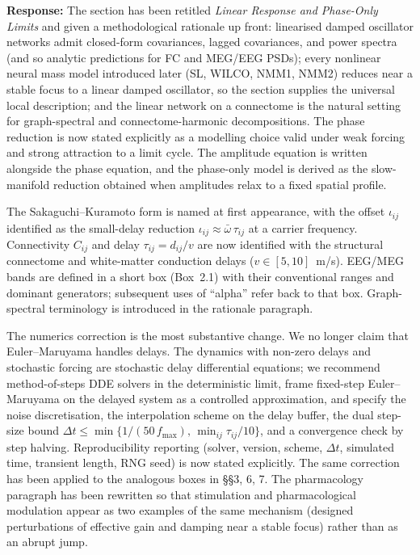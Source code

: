 \documentclass[12pt,a4paper]{article}
\newcommand{\ourresponse}[1]{\par\noindent\textbf{Response:} #1\par\medskip}
\begin{document}
\ourresponse{The section has been retitled \emph{Linear Response and Phase-Only Limits} and given a methodological rationale up front: linearised damped oscillator networks admit closed-form covariances, lagged covariances, and power spectra (and so analytic predictions for FC and MEG/EEG PSDs); every nonlinear neural mass model introduced later (SL, WILCO, NMM1, NMM2) reduces near a stable focus to a linear damped oscillator, so the section supplies the universal local description; and the linear network on a connectome is the natural setting for graph-spectral and connectome-harmonic decompositions. The phase reduction is now stated explicitly as a modelling choice valid under weak forcing and strong attraction to a limit cycle. The amplitude equation is written alongside the phase equation, and the phase-only model is derived as the slow-manifold reduction obtained when amplitudes relax to a fixed spatial profile.

The Sakaguchi--Kuramoto form is named at first appearance, with the offset $\iota_{ij}$ identified as the small-delay reduction $\iota_{ij}\approx\bar\omega\,\tau_{ij}$ at a carrier frequency. Connectivity $C_{ij}$ and delay $\tau_{ij}=d_{ij}/v$ are now identified with the structural connectome and white-matter conduction delays ($v\in[5,10]$~m/s). EEG/MEG bands are defined in a short box (Box~2.1) with their conventional ranges and dominant generators; subsequent uses of ``alpha'' refer back to that box. Graph-spectral terminology is introduced in the rationale paragraph.

The numerics correction is the most substantive change. We no longer claim that Euler--Maruyama handles delays. The dynamics with non-zero delays and stochastic forcing are stochastic delay differential equations; we recommend method-of-steps DDE solvers in the deterministic limit, frame fixed-step Euler--Maruyama on the delayed system as a controlled approximation, and specify the noise discretisation, the interpolation scheme on the delay buffer, the dual step-size bound $\Delta t\le\min\{1/(50\,f_{\max}),\,\min_{ij}\tau_{ij}/10\}$, and a convergence check by step halving. Reproducibility reporting (solver, version, scheme, $\Delta t$, simulated time, transient length, RNG seed) is now stated explicitly. The same correction has been applied to the analogous boxes in §§3, 6, 7. The pharmacology paragraph has been rewritten so that stimulation and pharmacological modulation appear as two examples of the same mechanism (designed perturbations of effective gain and damping near a stable focus) rather than as an abrupt jump.}
\end{document}
